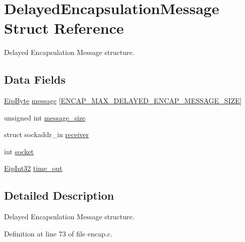 \hypertarget{structDelayedEncapsulationMessage}{\section{\-Delayed\-Encapsulation\-Message \-Struct \-Reference}
\label{d4/da1/structDelayedEncapsulationMessage}
}


\-Delayed \-Encapsulation \-Message structure.  


\subsection*{\-Data \-Fields}
\begin{DoxyCompactItemize}
\item 
\hyperlink{typedefs_8h_a168bac8db7e7e6d944700e1ac4717ae3}{\-Eip\-Byte} \hyperlink{structDelayedEncapsulationMessage_a8a7d84611a4b658a8c27919330bb4883}{message} \mbox{[}\hyperlink{encap_8c_a16f520a54eb1c9fb635985bfc123aa8c}{\-E\-N\-C\-A\-P\-\_\-\-M\-A\-X\-\_\-\-D\-E\-L\-A\-Y\-E\-D\-\_\-\-E\-N\-C\-A\-P\-\_\-\-M\-E\-S\-S\-A\-G\-E\-\_\-\-S\-I\-Z\-E}\mbox{]}
\item 
unsigned int \hyperlink{structDelayedEncapsulationMessage_ac0dba200faf880b91e7adc59d2c2cbbe}{message\-\_\-size}
\item 
struct sockaddr\-\_\-in \hyperlink{structDelayedEncapsulationMessage_a37e02e829c0cd2523010fc12da68e169}{receiver}
\item 
int \hyperlink{structDelayedEncapsulationMessage_af616a8ae48b9bc51c1117985acc8c37f}{socket}
\item 
\hyperlink{typedefs_8h_a3d850c4594f24c4fa1f1782e1034ee71}{\-Eip\-Int32} \hyperlink{structDelayedEncapsulationMessage_a9b68dcfcb0964b7c43bfe18054e71579}{time\-\_\-out}
\end{DoxyCompactItemize}


\subsection{\-Detailed \-Description}
\-Delayed \-Encapsulation \-Message structure. 

\-Definition at line 73 of file encap.\-c.



